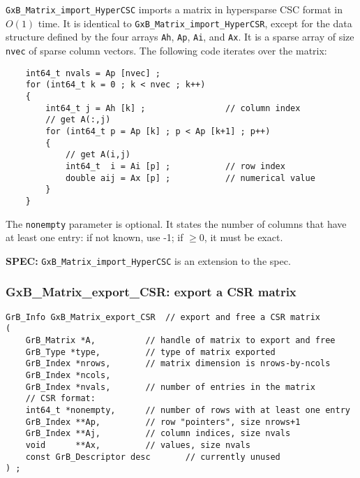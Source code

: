 \documentclass[12pt]{article}
\begin{document}
\verb'GxB_Matrix_import_HyperCSC' imports a matrix in hypersparse CSC format in
$O(1)$ time.  It is identical to \verb'GxB_Matrix_import_HyperCSR', except for
the data structure defined by the four arrays \verb'Ah', \verb'Ap', \verb'Ai',
and \verb'Ax'.  It is a sparse array of size \verb'nvec' of sparse column
vectors.  The following code iterates over the matrix:

    \vspace{-0.10in}
    {\footnotesize
    \begin{verbatim}
    int64_t nvals = Ap [nvec] ;
    for (int64_t k = 0 ; k < nvec ; k++)
    {
        int64_t j = Ah [k] ;                // column index
        // get A(:,j)
        for (int64_t p = Ap [k] ; p < Ap [k+1] ; p++)
        {
            // get A(i,j)
            int64_t  i = Ai [p] ;           // row index
            double aij = Ax [p] ;           // numerical value
        }
    } \end{verbatim}}

\vspace{-0.12in}
The \verb'nonempty' parameter is optional.  It states the number of columns
that have at least one entry: if not known, use -1;
if $\ge 0$, it must be exact.

\begin{spec}
{\bf SPEC:} \verb'GxB_Matrix_import_HyperCSC' is an extension to the spec.
\end{spec}

\newpage
\subsubsection{{\sf GxB\_Matrix\_export\_CSR:} export a CSR matrix}
\label{matrix_export_csr}

\begin{mdframed}[userdefinedwidth=6in]
{\footnotesize
\begin{verbatim}
GrB_Info GxB_Matrix_export_CSR  // export and free a CSR matrix
(
    GrB_Matrix *A,          // handle of matrix to export and free
    GrB_Type *type,         // type of matrix exported
    GrB_Index *nrows,       // matrix dimension is nrows-by-ncols
    GrB_Index *ncols,
    GrB_Index *nvals,       // number of entries in the matrix
    // CSR format:
    int64_t *nonempty,      // number of rows with at least one entry
    GrB_Index **Ap,         // row "pointers", size nrows+1
    GrB_Index **Aj,         // column indices, size nvals
    void      **Ax,         // values, size nvals
    const GrB_Descriptor desc       // currently unused
) ;
\end{verbatim}
} \end{mdframed}
\end{document}
